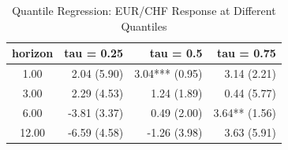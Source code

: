 \begin{table}[ht]
\centering
\caption{Quantile Regression: EUR/CHF Response at Different Quantiles} 
\label{tab:quantile_regression}
\begin{tabular}{crrr}
  \toprule
horizon & tau = 0.25 & tau = 0.5 & tau = 0.75 \\ 
  \midrule
1.00 & 2.04 (5.90) & 3.04*** (0.95) & 3.14 (2.21) \\ 
  3.00 & 2.29 (4.53) & 1.24 (1.89) & 0.44 (5.77) \\ 
  6.00 & -3.81 (3.37) & 0.49 (2.00) & 3.64** (1.56) \\ 
  12.00 & -6.59 (4.58) & -1.26 (3.98) & 3.63 (5.91) \\ 
   \bottomrule
\end{tabular}
\end{table}
